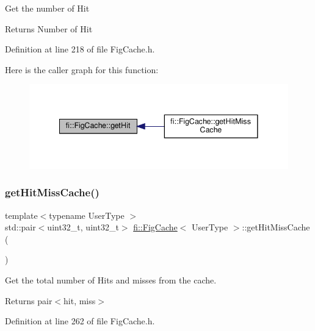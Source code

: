 Get the number of Hit \begin{DoxyReturn}{Returns}
Number of Hit 
\end{DoxyReturn}


Definition at line 218 of file Fig\+Cache.\+h.

Here is the caller graph for this function\+:
\nopagebreak
\begin{figure}[H]
\begin{center}
\leavevmode
\includegraphics[width=341pt]{d7/d31/classfi_1_1FigCache_a112e5ccf7834108682982dd4666a9bcb_icgraph}
\end{center}
\end{figure}
\mbox{\label{classfi_1_1FigCache_a90aff6f08938280b32bbe303913673da}} 
\subsubsection{\texorpdfstring{get\+Hit\+Miss\+Cache()}{getHitMissCache()}}
{\footnotesize\ttfamily template$<$typename User\+Type $>$ \\
std\+::pair$<$uint32\+\_\+t, uint32\+\_\+t$>$ \hyperlink{classfi_1_1FigCache}{fi\+::\+Fig\+Cache}$<$ User\+Type $>$\+::get\+Hit\+Miss\+Cache (\begin{DoxyParamCaption}{ }\end{DoxyParamCaption})\hspace{0.3cm}{\ttfamily [inline]}}



Get the total number of Hits and misses from the cache. 

\begin{DoxyReturn}{Returns}
pair$<$hit, miss$>$ 
\end{DoxyReturn}


Definition at line 262 of file Fig\+Cache.\+h.

